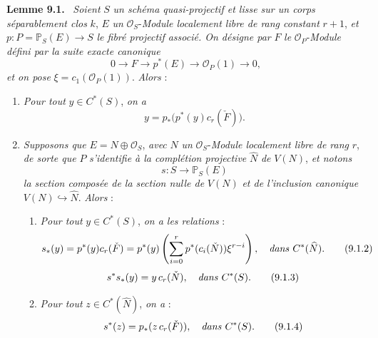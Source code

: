 \documentclass[11pt]{article}
\newenvironment{statement}[1]{\par\medskip\noindent\textbf{#1.}\ }{\par\medskip}
\begin{document}
\begin{statement}{Lemme 9.1}
\emph{Soient} $S$ \emph{un schéma quasi-projectif et lisse sur un corps séparablement clos} $k$, $E$ \emph{un} $\mathcal O_S$-\emph{Module localement libre de rang constant} $r+1$, \emph{et} $p:P=\mathbb P_S(E)\to S$ \emph{le fibré projectif associé. On désigne par} $F$ \emph{le} $\mathcal O_P$-\emph{Module défini par la suite exacte canonique}
\[
0\to F\to p^*(E)\to\mathcal O_P(1)\to0,
\tag{9.1.0}
\]
\emph{et on pose} $\xi=c_1(\mathcal O_P(1))$. \emph{Alors} :
\begin{enumerate}[label=(\roman*)]
\item \emph{Pour tout} $y\in C^*(S)$, \emph{on a}
\[
y=p_*\bigl(p^*(y)c_r(\check F)\bigr).
\tag{9.1.1}
\]
\item \emph{Supposons que} $E=N\oplus\mathcal O_S$, \emph{avec} $N$ \emph{un} $\mathcal O_S$-\emph{Module localement libre de rang} $r$, \emph{de sorte que} $P$ \emph{s'identifie à la complétion projective} $\widehat N$ \emph{de} $V(N)$, \emph{et notons}
\[
s:S\to\mathbb P_S(E)
\]
\emph{la section composée de la section nulle de} $V(N)$ \emph{et de l'inclusion canonique} $V(N)\hookrightarrow\widehat N$. \emph{Alors} :
\begin{enumerate}[label=(\alph*)]
\item \emph{Pour tout} $y\in C^*(S)$, \emph{on a les relations} :
\[
s_*(y)=p^*(y)c_r(\check F)=p^*(y)\left(\sum_{i=0}^r p^*(c_i(\check N))\xi^{r-i}\right),
\quad\text{\emph{dans} }C^*(\widehat N).
\tag{9.1.2}
\]
\[
s^*s_*(y)=y\,c_r(\check N),\quad\text{\emph{dans} }C^*(S).
\tag{9.1.3}
\]
\item
\emph{Pour tout} $z\in C^*(\widehat N)$, \emph{on a} :
\[
s^*(z)=p_*(z\,c_r(\check F)),\quad\text{\emph{dans} }C^*(S).
\tag{9.1.4}
\]
\end{enumerate}
\end{enumerate}
\end{statement}
\end{document}
